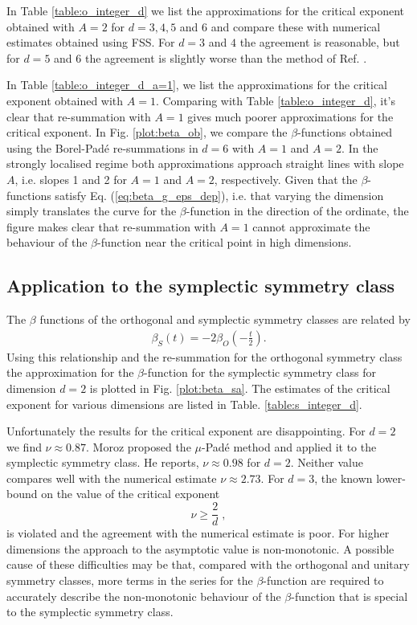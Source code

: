 \documentclass[singlecolumn]{jpsj3}
\begin{document}
In Table \ref{table:o_integer_d} we list the approximations for the critical exponent obtained with $A=2$ for $d = 3,4,5$ and $6$ and compare these with numerical estimates obtained using FSS.
For  $d=3$ and $4$ the agreement is reasonable, but for $d=5$ and $6$ the agreement is slightly worse than the method of Ref. .

In Table \ref{table:o_integer_d_a=1}, we list the approximations for the critical exponent obtained with
$A=1$.
Comparing with Table \ref{table:o_integer_d}, it's clear that re-summation with $A=1$ gives much poorer approximations for the critical exponent.
In Fig. \ref{plot:beta_ob}, we compare the $\beta$-functions obtained using the Borel-Pad\'e re-summations in $d=6$ with $A=1$ and $A=2$.
In the strongly localised regime both approximations approach straight lines with slope $A$, i.e. slopes 1 and 2 for $A=1$ and $A=2$, respectively.
Given that the $\beta$-functions satisfy Eq. (\ref{eq:beta_g_eps_dep}), i.e. that varying the dimension simply translates the curve for the $\beta$-function in the direction of the ordinate,
the figure makes clear that re-summation with $A=1$ cannot approximate the behaviour of the $\beta$-function near  the critical point in high dimensions.

\subsection{Application to the symplectic symmetry class}

The $\beta$ functions of the orthogonal and symplectic symmetry classes are related by \cite{Hikami92}
\begin{align}
	\beta_S(t)=-2\beta_O(-\frac{t}{2}).
\end{align}
Using this relationship and the re-summation for the orthogonal symmetry class the approximation for the $\beta$-function for the symplectic symmetry class for  dimension $d=2$ is plotted in Fig. \ref{plot:beta_sa}.
The estimates of the critical exponent for various dimensions are listed in Table. \ref{table:s_integer_d}.

Unfortunately the results for the critical exponent are disappointing.
For $d=2$ we find $\nu\approx 0.87$.
Moroz\cite{Moroz96} proposed the $\mu$-Pad\'e method and applied it to the symplectic symmetry class. He reports, $\nu \approx 0.98$ for $d=2$.
Neither value compares well with the numerical estimate $\nu\approx 2.73$.
For $d=3$, the known lower-bound on the value of the critical exponent\cite{Chayes86, Kramer93}
\begin{equation}
	\nu \ge \frac{2}{d} \label{eq:lowerbound} \;,
\end{equation}
is violated
and the agreement with the numerical estimate\cite{Asada05} is poor.
For higher dimensions the approach to the asymptotic value is non-monotonic.
A possible cause of these difficulties may be that, compared with the orthogonal and unitary symmetry classes,
more terms in the series for the $\beta$-function  are required to accurately describe the non-monotonic behaviour of the $\beta$-function that is special to the symplectic symmetry class.
\end{document}
